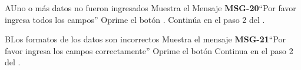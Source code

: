 		\begin{UCtrayectoriaA}{A}{Uno o más datos no fueron ingresados}
			\UCpaso Muestra el Mensaje {\bf MSG-20}``Por favor ingresa todos los campos''
			\UCpaso[\UCactor] Oprime el botón .
			\UCpaso[\UCactor] Continúa en el paso 2 del .
		\end{UCtrayectoriaA}
		
		\begin{UCtrayectoriaA}{B}{Los formatos de los datos son incorrectos}
			\UCpaso Muestra el mensaje {\bf MSG-21}``Por favor ingresa los campos correctamente''
			\UCpaso[\UCactor] Oprime el botón 
			\UCpaso Continua en el paso 2 del .
		\end{UCtrayectoriaA}

